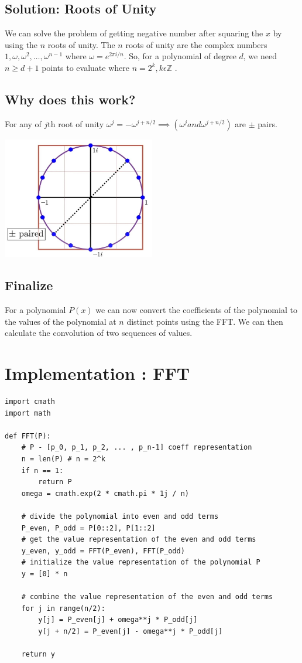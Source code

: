 \documentclass{report}
\begin{document}
\section{Solution: Roots of Unity}
We can solve the problem of getting negative number after squaring the \(x\) by using the \(n\) roots of unity. The \(n\) roots of unity are the complex numbers \(1, \omega, \omega^2, \ldots, \omega^{n-1}\) where \(\omega = e^{2\pi i/n}\). 
So, for a polynomial of degree \(d\), we need \(n \geq d + 1\) points to evaluate where $n = 2^k , k \epsilon   \mathbb{Z} $ .



\section{Why does this work?}
For any of $j$th root of unity $\omega^j = - \omega^{j + n/2} \implies (\omega^j and \omega^{j + n/2})$ are $\pm$ pairs.


	\includegraphics[width=0.5\textwidth]{rootsOfUnity.jpg}
 
\section{Finalize}
For a polynomial $P(x)$ we can now convert the coefficients of the polynomial to the values of the polynomial at \(n\) distinct points using the FFT. We can then calculate the convolution of two sequences of values. 


\chapter{Implementation : FFT}

\begin{verbatim}
import cmath
import math

def FFT(P):
	# P - [p_0, p_1, p_2, ... , p_n-1] coeff representation
	n = len(P) # n = 2^k
	if n == 1:
		return P
	omega = cmath.exp(2 * cmath.pi * 1j / n)

	# divide the polynomial into even and odd terms
	P_even, P_odd = P[0::2], P[1::2]
	# get the value representation of the even and odd terms
	y_even, y_odd = FFT(P_even), FFT(P_odd)
	# initialize the value representation of the polynomial P
	y = [0] * n

	# combine the value representation of the even and odd terms
	for j in range(n/2):
		y[j] = P_even[j] + omega**j * P_odd[j]
		y[j + n/2] = P_even[j] - omega**j * P_odd[j]

	return y

\end{verbatim}
\end{document}
